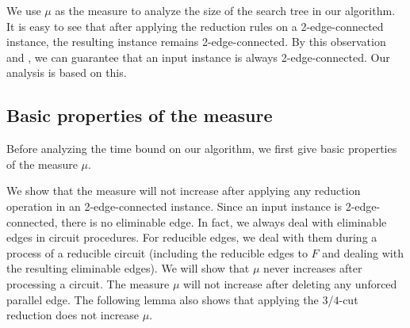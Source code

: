 \documentclass[runningheads]{llncs}
\begin{document}
We  use $\mu$ as the measure to analyze the size of the search tree in our algorithm.
It is easy to see that after applying the reduction rules on a 2-edge-connected instance,
 the resulting instance remains 2-edge-connected. By this observation and ,
we can guarantee that  an input instance is always 2-edge-connected. Our analysis is based on this.

\subsection{Basic properties of the measure}
Before analyzing the time bound on our algorithm,
we first give basic properties of  the measure  $\mu$.

We show that the measure will not increase after applying any reduction operation  in an 2-edge-connected instance.
Since an input instance is 2-edge-connected,  there is no eliminable edge.
In fact, we always deal with eliminable edges in circuit procedures.
For reducible edges, we deal with them during a process of a reducible circuit
(including the reducible edges to $F$ and dealing with the resulting eliminable edges).
We will show that $\mu$ never increases after processing a circuit.
The measure $\mu$ will not increase after deleting any unforced parallel edge.
The following lemma also shows that  applying the $3$/$4$-cut reduction does not increase $\mu$.

\bigskip
\end{document}
